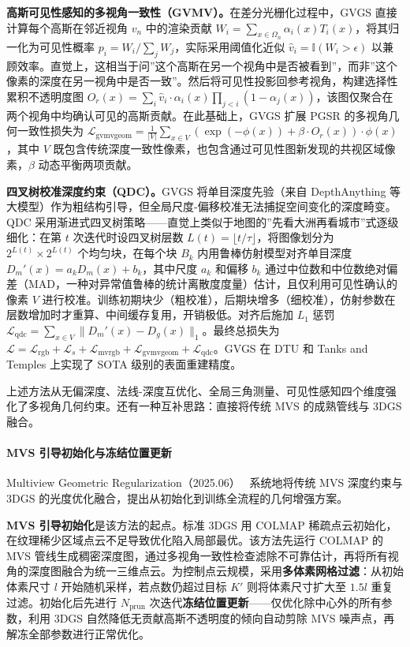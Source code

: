 \textbf{高斯可见性感知的多视角一致性（GVMV）。}在差分光栅化过程中，GVGS 直接计算每个高斯在邻近视角 $v_n$ 中的渲染贡献 $W_i = \sum_{x \in \Omega_n} \alpha_i(x) T_i(x)$，将其归一化为可见性概率 $p_i = W_i / \sum_j W_j$，实际采用阈值化近似 $\hat{v}_i = \mathbb{I}(W_i > \epsilon)$ 以兼顾效率。直觉上，这相当于问”这个高斯在另一个视角中是否被看到”，而非”这个像素的深度在另一视角中是否一致”。然后将可见性投影回参考视角，构建选择性累积不透明度图 $O_r(x) = \sum_i \hat{v}_i \cdot \alpha_i(x) \prod_{j<i}(1-\alpha_j(x))$，该图仅聚合在两个视角中均确认可见的高斯贡献。在此基础上，GVGS 扩展 PGSR 的多视角几何一致性损失为 $\mathcal{L}_{\text{gvmvgeom}} = \frac{1}{|V|}\sum_{x \in V} (\exp(-\phi(x)) + \beta \cdot O_r(x)) \cdot \phi(x)$，其中 $V$ 既包含传统深度一致性像素，也包含通过可见性图新发现的共视区域像素，$\beta$ 动态平衡两项贡献。

\textbf{四叉树校准深度约束（QDC）。}GVGS 将单目深度先验（来自 DepthAnything 等大模型）作为粗结构引导，但全局尺度-偏移校准无法捕捉空间变化的深度畸变。QDC 采用渐进式四叉树策略——直觉上类似于地图的”先看大洲再看城市”式逐级细化：在第 $t$ 次迭代时设四叉树层数 $L(t) = \lfloor t/\tau \rfloor$，将图像划分为 $2^{L(t)} \times 2^{L(t)}$ 个均匀块，在每个块 $B_k$ 内用鲁棒仿射模型对齐单目深度 $D_m'(x) = a_k D_m(x) + b_k$，其中尺度 $a_k$ 和偏移 $b_k$ 通过中位数和中位数绝对偏差（MAD，一种对异常值鲁棒的统计离散度度量）估计，且仅利用可见性确认的像素 $V$ 进行校准。训练初期块少（粗校准），后期块增多（细校准），仿射参数在层数增加时才重算、中间缓存复用，开销极低。对齐后施加 $L_1$ 惩罚 $\mathcal{L}_{\text{qdc}} = \sum_{x \in V} \|D_m'(x) - D_g(x)\|_1$。最终总损失为 $\mathcal{L} = \mathcal{L}_{\text{rgb}} + \mathcal{L}_s + \mathcal{L}_{\text{mvrgb}} + \mathcal{L}_{\text{gvmvgeom}} + \mathcal{L}_{\text{qdc}}$。GVGS 在 DTU 和 Tanks and Temples 上实现了 SOTA 级别的表面重建精度。

上述方法从无偏深度、法线-深度互优化、全局三角测量、可见性感知四个维度强化了多视角几何约束。还有一种互补思路：直接将传统 MVS 的成熟管线与 3DGS 融合。

\paragraph{MVS 引导初始化与冻结位置更新}

Multiview Geometric Regularization（2025.06）~\cite{2506_13508} 系统地将传统 MVS 深度约束与 3DGS 的光度优化融合，提出从初始化到训练全流程的几何增强方案。

\textbf{MVS 引导初始化}是该方法的起点。标准 3DGS 用 COLMAP 稀疏点云初始化，在纹理稀少区域点云不足导致优化陷入局部最优。该方法先运行 COLMAP 的 MVS 管线生成稠密深度图，通过多视角一致性检查滤除不可靠估计，再将所有视角的深度图融合为统一三维点云。为控制点云规模，采用\textbf{多体素网格过滤}：从初始体素尺寸 $l$ 开始随机采样，若点数仍超过目标 $K'$ 则将体素尺寸扩大至 $1.5l$ 重复过滤。初始化后先进行 $N_{\text{prun}}$ 次迭代\textbf{冻结位置更新}——仅优化除中心外的所有参数，利用 3DGS 自然降低无贡献高斯不透明度的倾向自动剪除 MVS 噪声点，再解冻全部参数进行正常优化。

